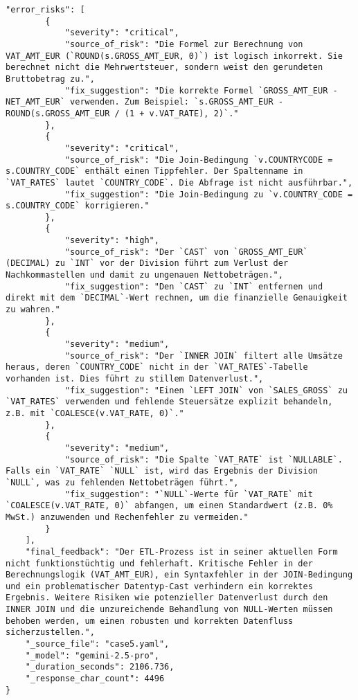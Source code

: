 \begin{lstlisting}[caption={Ausgabe: Gemini 2.5 Pro Anwendungsfall 5 Konsistenzdurchlauf},label={gemini_case5_prompt2}]
    "error_risks": [
        {
            "severity": "critical",
            "source_of_risk": "Die Formel zur Berechnung von VAT_AMT_EUR (`ROUND(s.GROSS_AMT_EUR, 0)`) ist logisch inkorrekt. Sie berechnet nicht die Mehrwertsteuer, sondern weist den gerundeten Bruttobetrag zu.",
            "fix_suggestion": "Die korrekte Formel `GROSS_AMT_EUR - NET_AMT_EUR` verwenden. Zum Beispiel: `s.GROSS_AMT_EUR - ROUND(s.GROSS_AMT_EUR / (1 + v.VAT_RATE), 2)`."
        },
        {
            "severity": "critical",
            "source_of_risk": "Die Join-Bedingung `v.COUNTRYCODE = s.COUNTRY_CODE` enthält einen Tippfehler. Der Spaltenname in `VAT_RATES` lautet `COUNTRY_CODE`. Die Abfrage ist nicht ausführbar.",
            "fix_suggestion": "Die Join-Bedingung zu `v.COUNTRY_CODE = s.COUNTRY_CODE` korrigieren."
        },
        {
            "severity": "high",
            "source_of_risk": "Der `CAST` von `GROSS_AMT_EUR` (DECIMAL) zu `INT` vor der Division führt zum Verlust der Nachkommastellen und damit zu ungenauen Nettobeträgen.",
            "fix_suggestion": "Den `CAST` zu `INT` entfernen und direkt mit dem `DECIMAL`-Wert rechnen, um die finanzielle Genauigkeit zu wahren."
        },
        {
            "severity": "medium",
            "source_of_risk": "Der `INNER JOIN` filtert alle Umsätze heraus, deren `COUNTRY_CODE` nicht in der `VAT_RATES`-Tabelle vorhanden ist. Dies führt zu stillem Datenverlust.",
            "fix_suggestion": "Einen `LEFT JOIN` von `SALES_GROSS` zu `VAT_RATES` verwenden und fehlende Steuersätze explizit behandeln, z.B. mit `COALESCE(v.VAT_RATE, 0)`."
        },
        {
            "severity": "medium",
            "source_of_risk": "Die Spalte `VAT_RATE` ist `NULLABLE`. Falls ein `VAT_RATE` `NULL` ist, wird das Ergebnis der Division `NULL`, was zu fehlenden Nettobeträgen führt.",
            "fix_suggestion": "`NULL`-Werte für `VAT_RATE` mit `COALESCE(v.VAT_RATE, 0)` abfangen, um einen Standardwert (z.B. 0% MwSt.) anzuwenden und Rechenfehler zu vermeiden."
        }
    ],
    "final_feedback": "Der ETL-Prozess ist in seiner aktuellen Form nicht funktionstüchtig und fehlerhaft. Kritische Fehler in der Berechnungslogik (VAT_AMT_EUR), ein Syntaxfehler in der JOIN-Bedingung und ein problematischer Datentyp-Cast verhindern ein korrektes Ergebnis. Weitere Risiken wie potenzieller Datenverlust durch den INNER JOIN und die unzureichende Behandlung von NULL-Werten müssen behoben werden, um einen robusten und korrekten Datenfluss sicherzustellen.",
    "_source_file": "case5.yaml",
    "_model": "gemini-2.5-pro",
    "_duration_seconds": 2106.736,
    "_response_char_count": 4496
}
\end{lstlisting}

